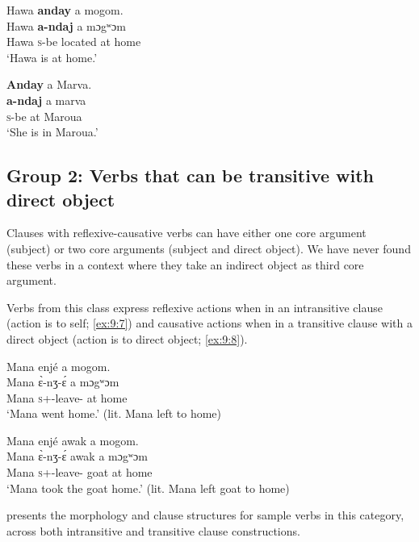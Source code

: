\ea \label{ex:9:5}
Hawa  \textbf{anday} a  mogom.\\
\gll  Hawa \textbf{a-ndaj}    a  mɔgʷɔm\\
      Hawa  {\textsc{s}-be located}  at  home\\
\glt  ‘Hawa is at home.’ 
\z

\ea \label{ex:9:6}
\textbf{Anday}  a  Marva.\\
\gll  \textbf{a-ndaj}   a   marva\\
      \textsc{s}-be  at  Maroua\\
\glt  ‘She is in Maroua.’
\z
{}
\subsection{Group 2: Verbs that can be transitive with direct object}\label{sec:9.2.2}

Clauses with reflexive-causative verbs can have either one core argument (subject) or two core arguments (subject and direct object). We have never found these verbs in a context where they take an indirect object as third core argument. 

Verbs from this class express reflexive actions when in an intransitive clause (action is to self; \ref{ex:9:7}) and causative actions when in a transitive clause with a direct object (action is to direct object; \ref{ex:9:8}). 

\ea \label{ex:9:7}
Mana  enjé  a  mogom. \\
\gll  Mana   \`{ɛ}-nʒ-\'{ɛ}     a   mɔgʷɔm \\
      Mana  \textsc{s}+{\PFV}-leave-{\CL}  at  home\\
\glt  ‘Mana went home.’ (lit. Mana left to home)  
\z

\ea \label{ex:9:8}
Mana  enjé  awak  a  mogom. \\
\gll  Mana   \`{ɛ}-nʒ-\'{ɛ}     awak   a   mɔgʷɔm\\
      Mana  \textsc{s}+{\PFV}-leave-{\CL}  goat  at  home\\
\glt  ‘Mana took the goat home.’ (lit. Mana left goat to home) 
\z

 presents the morphology and clause structures for sample verbs in this category, across both intransitive and transitive clause constructions.

